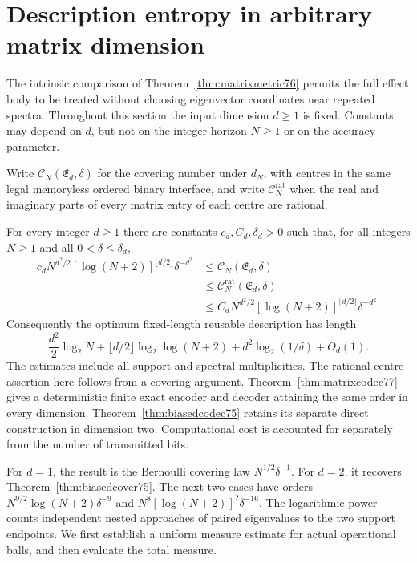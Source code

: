 \section{Description entropy in arbitrary matrix dimension}
\label{sec:matrixentropy76}
The intrinsic comparison of Theorem~\ref{thm:matrixmetric76} permits
the full effect body to be treated without choosing eigenvector
coordinates near repeated spectra. Throughout this section the input
dimension $d\ge1$ is fixed. Constants may depend on $d$, but not on the
integer horizon $N\ge1$ or on the accuracy parameter.

Write $\mathcal C_N(\mathfrak E_d,\delta)$ for the covering number under
$d_N$, with centres in the same legal memoryless ordered binary
interface, and write $\mathcal C_N^{\mathrm{rat}}$ when the real and
imaginary parts of every matrix entry of each centre are rational.

\begin{theorem}\label{thm:matrixcover76}
For every integer $d\ge1$ there are constants $c_d,C_d,\delta_d>0$
such that, for all integers $N\ge1$ and all $0<\delta\le\delta_d$,
\begin{equation}\label{eq:matrixcover76}
\begin{split}
 c_d N^{d^2/2}[\log(N+2)]^{\lfloor d/2\rfloor}\delta^{-d^2}
 &\le \mathcal C_N(\mathfrak E_d,\delta)\\
 &\le \mathcal C_N^{\mathrm{rat}}(\mathfrak E_d,\delta)\\
 &\le C_d N^{d^2/2}[\log(N+2)]^{\lfloor d/2\rfloor}\delta^{-d^2}.
\end{split}
\end{equation}
Consequently the optimum fixed-length reusable description has length
\begin{equation}\label{eq:matrixbits76}
 \frac{d^2}{2}\log_2N
 +\lfloor d/2\rfloor\log_2\log(N+2)
 +d^2\log_2(1/\delta)+O_d(1).
\end{equation}
The estimates include all support and spectral multiplicities. The
rational-centre assertion here follows from a covering argument.
Theorem~\ref{thm:matrixcodec77} gives a deterministic finite exact
encoder and decoder attaining the same order in every dimension.
Theorem~\ref{thm:biasedcodec75} retains its separate direct construction
in dimension two. Computational cost is accounted for separately
from the number of transmitted bits.
\end{theorem}

For $d=1$, the result is the Bernoulli covering law
$N^{1/2}\delta^{-1}$. For $d=2$, it recovers
Theorem~\ref{thm:biasedcover75}. The next two cases have orders
$N^{9/2}\log(N+2)\delta^{-9}$ and
$N^8[\log(N+2)]^2\delta^{-16}$. The logarithmic power counts independent
nested approaches of paired eigenvalues to the two support endpoints.
We first establish a uniform measure estimate for actual operational
balls, and then evaluate the total measure.

